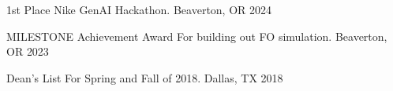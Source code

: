 



\begin{cvhonors}


\cvhonor
{1st Place} %
{Nike GenAI Hackathon.} %
{Beaverton, OR} %
{2024} %


\cvhonor
{MILESTONE Achievement Award} %
{For building out FO simulation.} %
{Beaverton, OR} %
{2023} %


\cvhonor
{Dean's List} %
{For Spring and Fall of 2018.} %
{Dallas, TX} %
{2018} %


\end{cvhonors}
